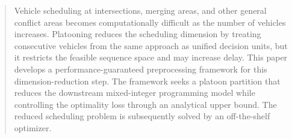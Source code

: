 \documentclass[preprint,12pt]{elsarticle}
\begin{document}
\begin{abstract}
Vehicle scheduling at intersections, merging areas, and other general conflict areas becomes computationally difficult as the number of vehicles increases. Platooning reduces the scheduling dimension by treating consecutive vehicles from the same approach as unified decision units, but it restricts the feasible sequence space and may increase delay. This paper develops a performance-guaranteed preprocessing framework for this dimension-reduction step. The framework seeks a platoon partition that reduces the downstream mixed-integer programming model while controlling the optimality loss through an analytical upper bound. The reduced scheduling problem is subsequently solved by an off-the-shelf optimizer.
\end{abstract}
\fi








\ifelsevierclass

\else

\fi

\end{document}

